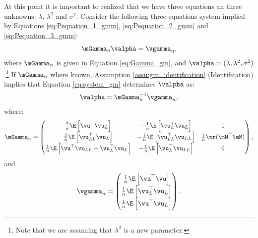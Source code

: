 \documentclass[english,12pt]{book}\usepackage[]{graphicx}\usepackage[]{xcolor}
\begin{document}
At this point it is important to realized that we have three equations an three unknowns: $\lambda$, $\lambda^2$ and $\sigma^2$. Consider the following three-equations system implied by Equations \eqref{eq:Pequation_1_gmm}, \eqref{eq:Pequation_2_gmm} and \eqref{eq:Pequation_3_gmm}:
\begin{equation}\label{eq:system_gm}
  \mGamma_n\valpha  = \vgamma_n,
\end{equation}
%
where $\mGamma_n$ is given in Equation \eqref{eq:Gamma_gm}, and $\valpha = (\lambda, \lambda^2, \sigma^2)$.\footnote{Note that we are assuming that $\lambda^2$ is a new parameter.} If $\mGamma_n$ where known, Assumption \ref{assu:gm_identification} (Identification) implies that Equation \eqref{eq:system_gm} determines $\valpha$ as:
\begin{equation*}
\valpha = \mGamma_n^{-1}\vgamma_n,
\end{equation*}
%
where:
\begin{equation}\label{eq:Gamma_gm}
  \mGamma_n = \begin{pmatrix}
   \frac{2}{n}\E\left[\vu^\top\vu_L\right] & -\frac{1}{n}\E\left[\vu_L^\top\vu_L\right] & 1 \\
   \frac{2}{n}\E\left[\vu^\top_{LL}\vu_L\right] & -\frac{1}{n}\E\left[\vu_{LL}^\top\vu_{LL}\right] & \frac{1}{n} \tr(\mM^\top\mM)\\
   \frac{1}{n}\E\left[\vu^\top\vu_{LL} + \vu_L^\top\vu_L\right] & -\frac{1}{n}\E\left[\vu_{L}^\top\vu_{LL}\right] & 0
        \end{pmatrix},
\end{equation}
%
and
\begin{equation}
  \vgamma_n = \begin{pmatrix}
  \frac{1}{n}\E\left[\vu^\top\vu\right] \\
  \frac{1}{n}\E\left[\vu^\top_L\vu_L\right] \\
  \frac{1}{n}\E\left[\vu^\top\vu_L\right]
        \end{pmatrix}.
\end{equation}
\end{document}
